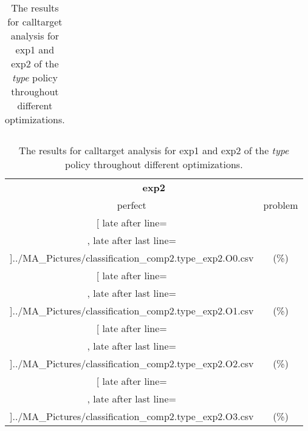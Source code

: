 \begin{table}[!htbp]
{\begin{tabular}{l|c|c|c}
    	\end{tabular}

	\begin{tabular}{|c|c}%

	\toprule
    \multicolumn{2}{c}{\bfseries exp2}\\
	
	     perfect &  problem %
	\\\midrule
	\csvreader[ late after line=\\, late after last line=\\\midrule]{../MA_Pictures/classification_comp2.type_exp2.O0.csv}{
}
	{\csvcolxiii (\csvcolxiv \%) & \csvcolxv (\csvcolxvi \%)}%
\multicolumn{1}{c}{}

	\\\midrule
	\csvreader[ late after line=\\, late after last line=\\\midrule]{../MA_Pictures/classification_comp2.type_exp2.O1.csv}{
}
	{\csvcolxiii (\csvcolxiv \%) & \csvcolxv (\csvcolxvi \%)}%
	
	\multicolumn{1}{c}{}

	\\\midrule
	\csvreader[ late after line=\\, late after last line=\\\midrule]{../MA_Pictures/classification_comp2.type_exp2.O2.csv}{
}
	{\csvcolxiii (\csvcolxiv \%) & \csvcolxv (\csvcolxvi \%)}%
	
\multicolumn{1}{c}{}
	\\\midrule
	\csvreader[ late after line=\\, late after last line=\\\bottomrule]{../MA_Pictures/classification_comp2.type_exp2.O3.csv}{
}
	{\csvcolxiii (\csvcolxiv \%) & \csvcolxv (\csvcolxvi \%)}%


    	\end{tabular}
}
		\caption {The results for calltarget analysis for exp1 and exp2 of the \textit{type} policy throughout different optimizations.}
		\label{tbl:CTdestinterexp12TYPE}
\end{table}


